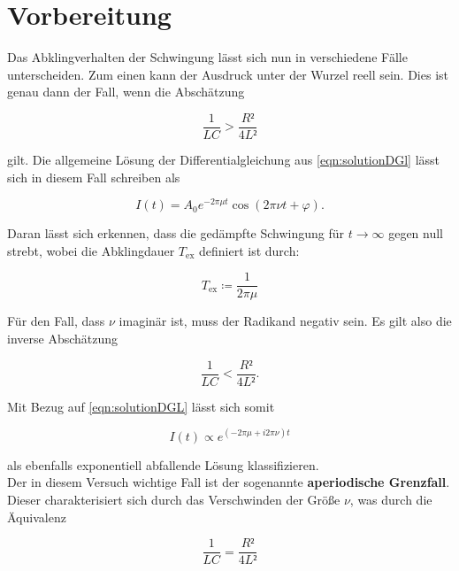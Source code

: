 \section{Vorbereitung}

Das Abklingverhalten der Schwingung lässt sich nun in verschiedene Fälle unterscheiden. Zum einen kann der Ausdruck 
unter der Wurzel reell sein. Dies ist genau dann der Fall, wenn die Abschätzung

\begin{equation}
\label{eqn:reell}
    \frac{1}{LC} > \frac{R²}{4L²}
\end{equation}

\noindent gilt. Die allgemeine Lösung der Differentialgleichung aus \eqref{eqn:solutionDGl} lässt sich in diesem Fall 
schreiben als

\begin{equation*}
    I(t) = A_0e^{-2\pi\mu{}t}\cos\left(2\pi\nu{}t + \varphi\right).
\end{equation*}

\noindent Daran lässt sich erkennen, dass die gedämpfte Schwingung für $t \rightarrow \infty$ gegen null strebt, wobei
die Abklingdauer $T_\text{ex}$ definiert ist durch:

\begin{equation*}
    T_\text{ex} \coloneqq \frac{1}{2\pi\mu}
\end{equation*}

\noindent Für den Fall, dass $\nu$ imaginär ist, muss der Radikand negativ sein. Es gilt also die inverse Abschätzung 

\begin{equation}
\label{eqn:imaginaer}
    \frac{1}{LC} < \frac{R²}{4L²}.
\end{equation}

\noindent Mit Bezug auf \eqref{eqn:solutionDGL} lässt sich somit 

\begin{equation*}
    I(t) \propto e^{\left(-2\pi\mu + i2\pi\nu\right)t}
\end{equation*}

\noindent als ebenfalls exponentiell abfallende Lösung klassifizieren.\\
Der in diesem Versuch wichtige Fall ist der sogenannte \textbf{aperiodische Grenzfall}. Dieser charakterisiert sich durch 
das Verschwinden der Größe $\nu$, was durch die Äquivalenz 

\begin{equation}
\label{eqn:Grenzfall}
    \frac{1}{LC} = \frac{R²}{4L²}
\end{equation}

